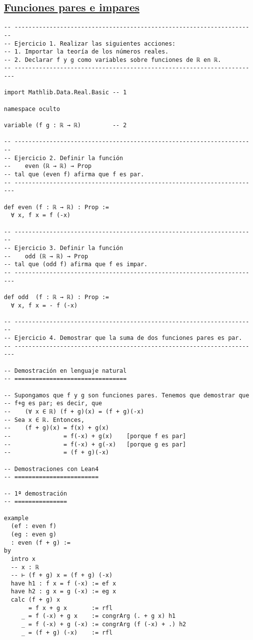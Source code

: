 \subsection{\href{./src/Logica/Funciones\_pares\_e\_impares.lean}{Funciones pares e impares}}
\label{sec:orgf902ab8}
\begin{verbatim}
-- ---------------------------------------------------------------------
-- Ejercicio 1. Realizar las siguientes acciones:
-- 1. Importar la teoría de los números reales.
-- 2. Declarar f y g como variables sobre funciones de ℝ en ℝ.
-- ----------------------------------------------------------------------

import Mathlib.Data.Real.Basic -- 1

namespace oculto

variable (f g : ℝ → ℝ)         -- 2

-- ---------------------------------------------------------------------
-- Ejercicio 2. Definir la función
--    even (ℝ → ℝ) → Prop
-- tal que (even f) afirma que f es par.
-- ----------------------------------------------------------------------

def even (f : ℝ → ℝ) : Prop :=
  ∀ x, f x = f (-x)

-- ---------------------------------------------------------------------
-- Ejercicio 3. Definir la función
--    odd (ℝ → ℝ) → Prop
-- tal que (odd f) afirma que f es impar.
-- ----------------------------------------------------------------------

def odd  (f : ℝ → ℝ) : Prop :=
  ∀ x, f x = - f (-x)

-- ---------------------------------------------------------------------
-- Ejercicio 4. Demostrar que la suma de dos funciones pares es par.
-- ----------------------------------------------------------------------

-- Demostración en lenguaje natural
-- ================================

-- Supongamos que f y g son funciones pares. Tenemos que demostrar que
-- f+g es par; es decir, que
--    (∀ x ∈ ℝ) (f + g)(x) = (f + g)(-x)
-- Sea x ∈ ℝ. Entonces,
--    (f + g)(x) = f(x) + g(x)
--               = f(-x) + g(x)    [porque f es par]
--               = f(-x) + g(-x)   [porque g es par]
--               = (f + g)(-x)

-- Demostraciones con Lean4
-- ========================

-- 1ª demostración
-- ===============

example
  (ef : even f)
  (eg : even g)
  : even (f + g) :=
by
  intro x
  -- x : ℝ
  -- ⊢ (f + g) x = (f + g) (-x)
  have h1 : f x = f (-x) := ef x
  have h2 : g x = g (-x) := eg x
  calc (f + g) x
       = f x + g x       := rfl
     _ = f (-x) + g x    := congrArg (. + g x) h1
     _ = f (-x) + g (-x) := congrArg (f (-x) + .) h2
     _ = (f + g) (-x)    := rfl


\end{verbatim}
